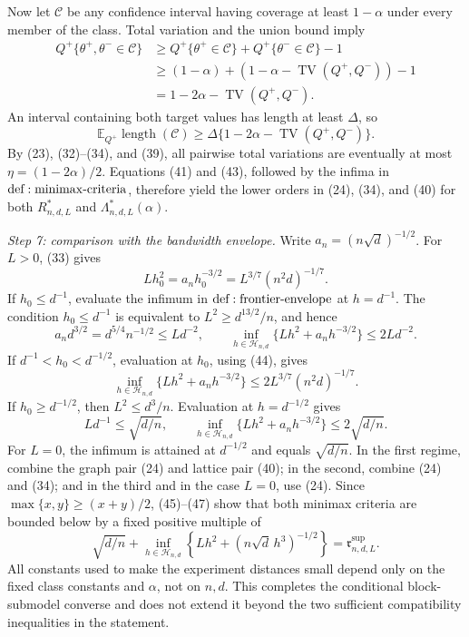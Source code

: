 Now let \(\mathcal C\) be any confidence interval having coverage at least \(1-\alpha\) under every member of the class.  Total variation and the union bound imply
\[
 \begin{aligned}
 Q^+\{\theta^+,\theta^-\in\mathcal C\}
 &\geq Q^+\{\theta^+\in\mathcal C\}
       +Q^+\{\theta^-\in\mathcal C\}-1\\
 &\geq(1-\alpha)+(1-\alpha-\operatorname{TV}(Q^+,Q^-))-1\\
 &=1-2\alpha-\operatorname{TV}(Q^+,Q^-).
 \end{aligned}
\tag{42}
\]
An interval containing both target values has length at least \(\Delta\), so
\[
 \mathbb E_{Q^+}\operatorname{length}(\mathcal C)
 \geq\Delta\{1-2\alpha-\operatorname{TV}(Q^+,Q^-)\}.
\tag{43}
\]
By (23), (32)--(34), and (39), all pairwise total variations are eventually at most \(\eta=(1-2\alpha)/2\).  Equations (41) and (43), followed by the infima in \({\rm def:minimax\text{-}criteria}\), therefore yield the lower orders in (24), (34), and (40) for both \(R^*_{n,d,L}\) and \(\Lambda^*_{n,d,L}(\alpha)\).

\textit{Step 7: comparison with the bandwidth envelope.}
Write \(a_n=(n\sqrt d)^{-1/2}\).  For \(L>0\), (33) gives
\[
 Lh_0^2=a_nh_0^{-3/2}=L^{3/7}(n^2d)^{-1/7}.
\tag{44}
\]
If \(h_0\leq d^{-1}\), evaluate the infimum in \({\rm def:frontier\text{-}envelope}\) at \(h=d^{-1}\).  The condition \(h_0\leq d^{-1}\) is equivalent to \(L^2\geq d^{13/2}/n\), and hence
\[
 a_nd^{3/2}=d^{5/4}n^{-1/2}\leq Ld^{-2},
 \qquad
 \inf_{h\in\mathcal H_{n,d}}\{Lh^2+a_nh^{-3/2}\}\leq2Ld^{-2}.
\tag{45}
\]
If \(d^{-1}<h_0<d^{-1/2}\), evaluation at \(h_0\), using (44), gives
\[
 \inf_{h\in\mathcal H_{n,d}}\{Lh^2+a_nh^{-3/2}\}
 \leq2L^{3/7}(n^2d)^{-1/7}.
\tag{46}
\]
If \(h_0\geq d^{-1/2}\), then \(L^2\leq d^3/n\).  Evaluation at \(h=d^{-1/2}\) gives
\[
 Ld^{-1}\leq\sqrt{d/n},
 \qquad
 \inf_{h\in\mathcal H_{n,d}}\{Lh^2+a_nh^{-3/2}\}
 \leq2\sqrt{d/n}.
\tag{47}
\]
For \(L=0\), the infimum is attained at \(d^{-1/2}\) and equals \(\sqrt{d/n}\).  In the first regime, combine the graph pair (24) and lattice pair (40); in the second, combine (24) and (34); and in the third and in the case \(L=0\), use (24).  Since \(\max\{x,y\}\geq(x+y)/2\), (45)--(47) show that both minimax criteria are bounded below by a fixed positive multiple of
\[
 \sqrt{d/n}+\inf_{h\in\mathcal H_{n,d}}
 \left\{Lh^2+(n\sqrt d\,h^3)^{-1/2}\right\}
 =\mathfrak r^{\mathrm{sup}}_{n,d,L}.
\tag{48}
\]
All constants used to make the experiment distances small depend only on the fixed class constants and \(\alpha\), not on \(n,d\).  This completes the conditional block-submodel converse and does not extend it beyond the two sufficient compatibility inequalities in the statement.